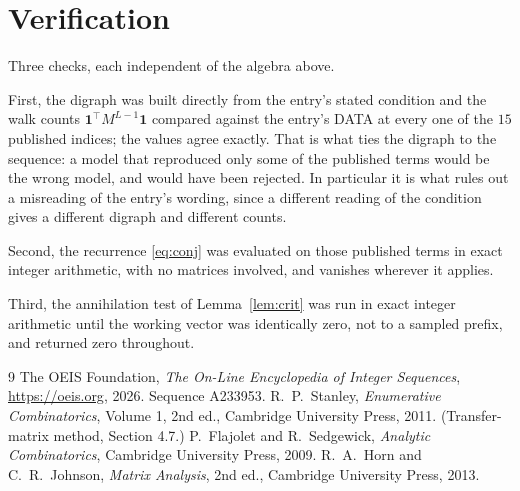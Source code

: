\documentclass[11pt,a4paper]{article}
\theoremstyle{plain}
\theoremstyle{definition}
\begin{document}
\section{Verification}

Three checks, each independent of the algebra above.

First, the digraph was built directly from the entry's stated condition and the walk counts
$\mathbf{1}^{\!\top}M^{L-1}\mathbf{1}$ compared against the entry's DATA at
every one of the $15$ published indices; the values agree exactly. That is what ties
the digraph to the sequence: a model that reproduced only some of the published terms would
be the wrong model, and would have been rejected. In particular it is what rules out a
misreading of the entry's wording, since a different reading of the condition gives a
different digraph and different counts.

Second, the recurrence \eqref{eq:conj} was evaluated on those published terms in exact
integer arithmetic, with no matrices involved, and vanishes wherever it applies.

Third, the annihilation test of Lemma~\ref{lem:crit} was run in exact integer arithmetic
until the working vector was identically zero, not to a sampled prefix, and returned zero
throughout.

\begin{thebibliography}{9}
 The OEIS Foundation, \emph{The On-Line Encyclopedia of Integer
Sequences}, \url{https://oeis.org}, 2026. Sequence A233953.
 R.~P.~Stanley, \emph{Enumerative Combinatorics}, Volume 1, 2nd ed.,
Cambridge University Press, 2011. (Transfer-matrix method, Section 4.7.)
 P.~Flajolet and R.~Sedgewick, \emph{Analytic Combinatorics}, Cambridge
University Press, 2009.
 R.~A.~Horn and C.~R.~Johnson, \emph{Matrix Analysis}, 2nd ed., Cambridge
University Press, 2013.
\end{thebibliography}
\end{document}
